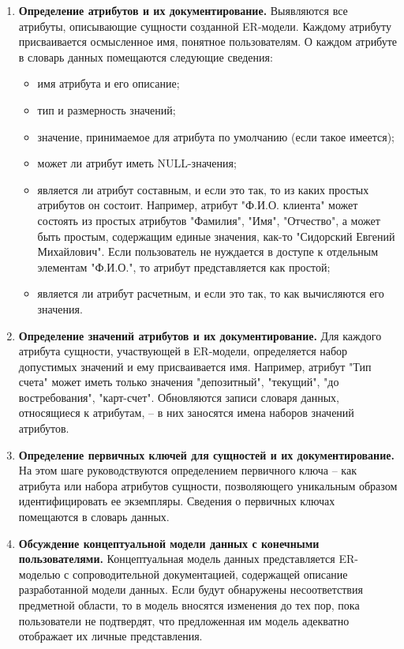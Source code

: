 \begin{enumerate}
	\item \textbf{Определение атрибутов и их документирование.}
	Выявляются все атрибуты, описывающие сущности созданной ER-модели. Каждому атрибуту присваивается осмысленное
	имя, понятное пользователям. О каждом атрибуте в словарь данных помещаются следующие сведения:
	\begin{itemize}
		\item имя атрибута и его описание;
		
		\item тип и размерность значений;
		
		\item значение, принимаемое для атрибута по умолчанию (если такое имеется);
		
		\item может ли атрибут иметь NULL-значения;
		
		\item является ли атрибут составным, и если это так, то из каких простых атрибутов он состоит.
		Например, атрибут "Ф.И.О. клиента" может состоять из простых атрибутов "Фамилия", "Имя",
		"Отчество", а может быть простым, содержащим единые значения, как-то "Сидорский Евгений
		Михайлович". Если пользователь не нуждается в доступе к отдельным элементам "Ф.И.О.",
		то атрибут представляется как простой;
		
		\item является ли атрибут расчетным, и если это так, то как вычисляются его значения.
	\end{itemize}
	
	\item \textbf{Определение значений атрибутов и их документирование.}
	Для каждого атрибута сущности, участвующей в ER-модели, определяется набор допустимых значений и ему
	присваивается имя. Например, атрибут "Тип счета" может иметь только значения "депозитный", "текущий",
	"до востребования", "карт-счет". Обновляются записи словаря данных, относящиеся к атрибутам, – в них
	заносятся имена наборов значений атрибутов.
	
	\item \textbf{Определение первичных ключей для сущностей и их документирование.}
	На этом шаге руководствуются определением первичного ключа – как атрибута или набора атрибутов сущности,
	позволяющего уникальным образом идентифицировать ее экземпляры. Сведения о первичных ключах помещаются
	в словарь данных.
	
	\item \textbf{Обсуждение концептуальной модели данных с конечными пользователями.}
	Концептуальная модель данных представляется ER-моделью с сопроводительной документацией, содержащей
	описание разработанной модели данных. Если будут обнаружены несоответствия предметной области, то в
	модель вносятся изменения  до тех пор, пока пользователи не подтвердят, что предложенная им модель
	адекватно отображает их личные представления.
\end{enumerate}

